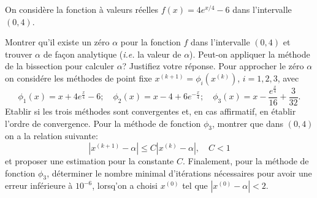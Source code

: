 \documentclass[11pt]{article}
\begin{document}
\begin{Exercise}[label={ex:2}]

On consid\`ere la fonction \`a valeurs r\'eelles $f(x) = 4
e^{x/4} - 6$ dans l'intervalle $(0,4)$.

\Question
Montrer qu'il existe un z\'ero $\alpha$ pour la fonction $f$ dans
l'intervalle $(0,4)$ et trouver $\alpha$ de fa\c con analytique (\emph{i.e.} la valeur de  $\alpha$).
\Question
Peut-on appliquer la m\'ethode de la bissection pour calculer
$\alpha$? Justifiez votre r\'eponse.
\Question
Pour approcher le z\'ero $\alpha$ on consid\'ere les m\'ethodes
de point fixe $x^{(k+1)} = \phi_i (x^{(k)})$, $i=1,2,3$, avec
\[
  \phi_1(x) = x + 4 e^{\frac{x}{4}} - 6; \quad \phi_2(x) = x - 4 + 6
  e^{-\frac{x}{4}}; \quad \phi_3(x) = x -
  \frac{e^{\frac{x}{4}}}{16} + \frac{3}{32}.
\]
Etablir si les trois m\'ethodes sont convergentes et, en cas
affirmatif, en \'etablir l'ordre de convergence.
\Question
Pour la m\'ethode de fonction $\phi_3$, montrer que dans $(0,4)$
on a la relation suivante:
\[
  | x^{(k+1)} - \alpha | \leq C |x^{(k)} - \alpha|, \quad C<1
\]
et proposer une estimation pour la constante $C$.
\Question
Finalement, pour la m\'ethode de fonction $\phi_3$, d\'eterminer
le nombre minimal d'it\'erations n\'ecessaires pour avoir une
erreur inf\'erieure \`a $10^{-6}$, lorsq'on a choisi $x^{(0)}$
tel que $|x^{(0)} - \alpha|<2$.
\end{Exercise}
\newpage
\end{document}
